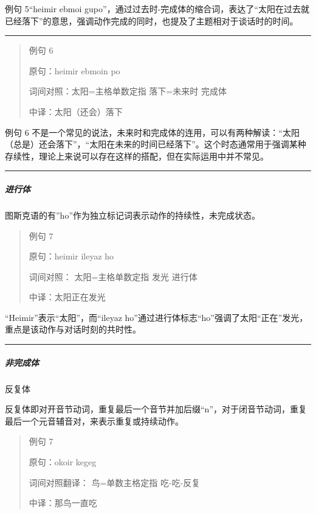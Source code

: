 \documentclass{article}
\begin{document}
例句 5``heimir ebmoi
gupo''，通过过去时-完成体的缩合词，表达了``太阳在过去就已经落下''的意思，强调动作完成的同时，也提及了主题相对于谈话时的时间。

\begin{center}\rule{0.5\linewidth}{0.5pt}\end{center}

\begin{quote}
例句 6

原句：heimir ebmoin po

词间对照：太阳=主格单数定指 落下=未来时 完成体

中译：太阳（还会）落下
\end{quote}

例句 6
不是一个常见的说法，未来时和完成体的连用，可以有两种解读：``太阳（总是）还会落下''，``太阳在未来的时间已经落下''。这个时态通常用于强调某种存续性，理论上来说可以存在这样的搭配，但在实际运用中并不常见。

\begin{center}\rule{0.5\linewidth}{0.5pt}\end{center}

\subparagraph{进行体}\label{ux8fdbux884cux4f53}

图斯克语的有''ho''作为独立标记词表示动作的持续性，未完成状态。

\begin{quote}
例句 7

原句：heimir ileyaz ho

词间对照： 太阳=主格单数定指 发光 进行体

中译：太阳正在发光
\end{quote}

``Heimir''表示``太阳''，而``ileyaz
ho''通过进行体标志``ho''强调了太阳``正在''发光，重点是该动作与对话时刻的共时性。

\begin{center}\rule{0.5\linewidth}{0.5pt}\end{center}

\subparagraph{非完成体}\label{ux975eux5b8cux6210ux4f53}

反复体

反复体即对开音节动词，重复最后一个音节并加后缀``n''，对于闭音节动词，重复最后一个元音辅音对，来表示重复或持续动作。

\begin{quote}
例句 7

原句：okoir kegeg

词间对照翻译： 鸟=单数主格定指 吃-吃-反复

中译：那鸟一直吃
\end{quote}
\end{document}
